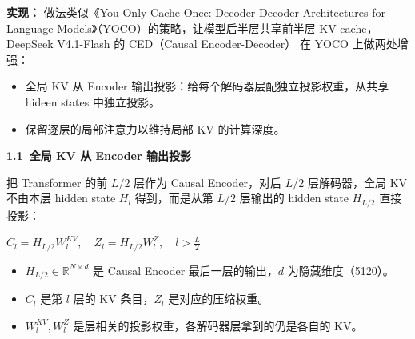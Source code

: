 \documentclass[zihao=false,fontset=windows]{ctexart}
\newcommand{\bigmath}[1]{%
  \begin{center}\large$\displaystyle #1$\end{center}%
}
\begin{document}
\textcolor{feishuRed}{\textbf{实现：}} 做法类似\href{https://arxiv.org/pdf/2405.05254}{《You Only Cache Once: Decoder-Decoder Architectures for Language Models》}（YOCO）的策略，让模型后半层共享前半层 KV cache，DeepSeek V4.1-Flash 的 CED（Causal Encoder-Decoder） 在 YOCO 上做两处增强：\par
\begin{itemize}
\item 
全局 KV 从 Encoder 输出投影：给每个解码器层配独立投影权重，从共享 hideen states 中独立投影。\par
\item 
保留逐层的局部注意力以维持局部 KV 的计算深度。\par
\end{itemize}

\par{}\vspace{0.8em}\noindent \begin{tcolorbox}[boxrule=0pt,arc=3pt,colback=callOrange,left=3pt,right=3pt,top=2pt,bottom=2pt,before skip=0pt,after skip=0pt]{\bfseries \textcolor{feishuBlue}{1.1}\ 全局 KV 从 Encoder 输出投影}\end{tcolorbox}\par\vspace{0.28em}

把 Transformer 的前 $L/2$ 层作为 Causal Encoder，对后 $L/2$ 层解码器，全局 KV 不由本层 hidden state $H_l$ 得到，而是从第 $L/2$ 层输出的 hidden state $H_{L/2}$ 直接投影：\par

\bigmath{C_l=H_{L/2}W_l^{KV},\quad Z_l=H_{L/2}W_l^Z,\quad l>\frac L2}
\begin{itemize}
\item 
$H_{L/2}\in\mathbb{R}^{N\times d}$ 是 Causal Encoder 最后一层的输出，$d$ 为隐藏维度（5120）。\par
\item 
$C_l$ 是第 $l$ 层的 KV 条目，$Z_l$ 是对应的压缩权重。\par
\item 
$W_l^{KV},W_l^Z$ 是层相关的投影权重，各解码器层拿到的仍是各自的 KV。\par
\end{itemize}
\end{document}
